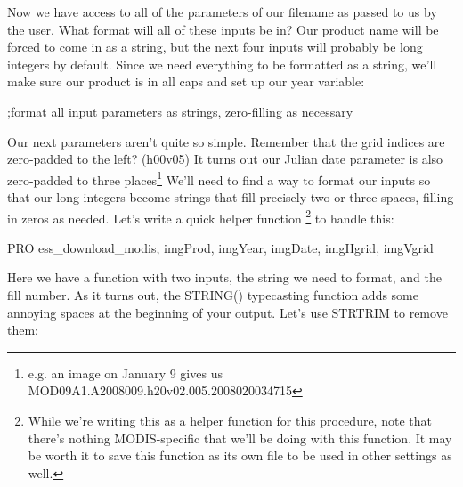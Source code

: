 \documentclass{book}
\newcommand{\codefill}{\centering$\longrightarrow$\hfill{\color{gray}\rule[0.1\baselineskip]{0.5\linewidth}{2pt}}\hfill$\longleftarrow$}
\newcounter{highlight}[page]
\newcommand{\tikzhighlightanchor}[1]{\ensuremath{\vcenter{\hbox{\tikz[remember picture, overlay]{\coordinate (#1 highlight \arabic{highlight});}}}}}
\newcommand{\bh}[0]{\stepcounter{highlight}\tikzhighlightanchor{begin}}
\newcommand{\eh}[0]{\tikzhighlightanchor{end}}
\theoremstyle{aside_style}
\begin{document}
Now we have access to all of the parameters of our filename as passed to us by the user. What format will all of these inputs be in? 
Our product name will be forced to come in as a string, but the next four inputs will probably be long integers by default. 
Since we need everything to be formatted as a string, we'll make sure our product is in all caps and set up our year variable:

\begin{idl}
;format all input parameters as strings, zero-filling as necessary
\end{idl}

Our next parameters aren't quite so simple. Remember that the grid indices are zero-padded to the left? (h00v05)
It turns out our Julian date parameter is also zero-padded to three places\footnote{e.g. an image on January 9 gives us MOD09A1.A2008009.h20v02.005.2008020034715}
We'll need to find a way to format our inputs so that our long integers become strings that fill precisely two or three spaces, filling in zeros as needed.
Let's write a quick helper function
\footnote{While we're writing this as a helper function for this procedure, note that there's nothing MODIS-specific that we'll be doing with this function.
It may be worth it to save this function as its own file to be used in other settings as well.}
 to handle this:

\begin{idl}
  

    
    
  


PRO ess_download_modis, imgProd, imgYear, imgDate, imgHgrid, imgVgrid
\end{idl}

Here we have a function with two inputs, the string we need to format, and the fill number.
As it turns out, the STRING() typecasting function adds some annoying spaces at the beginning of your output. Let's use STRTRIM to remove them:
\end{document}
